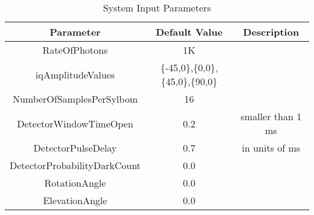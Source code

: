 \begin{refsection}
\begin{table}[H]
\centering
\caption{System Input Parameters}
\label{tb:inputparameters}
\begin{tabular}{|c|c|c|}
\hline
\textbf{Parameter}                      & \textbf{Default Value}                                & \textbf{Description} \\ \hline
RateOfPhotons                           & 1K                                                    &                 \\ \hline
iqAmplitudeValues                       & \{-45,0\},\{0,0\},\{45,0\},\{90,0\}   &                 \\ \hline
NumberOfSamplesPerSylbom                & 16                                                    &                   \\ \hline
DetectorWindowTimeOpen                  & 0.2                                                   & smaller than 1 ms \\ \hline
DetectorPulseDelay                      & 0.7                                                   & in units of ms \\ \hline
DetectorProbabilityDarkCount            & 0.0                                                   &    \\ \hline
RotationAngle                           & 0.0                                                   & \\ \hline
ElevationAngle                          & 0.0                                                   & \\ \hline

\end{tabular}
\end{table}


\end{refsection}
